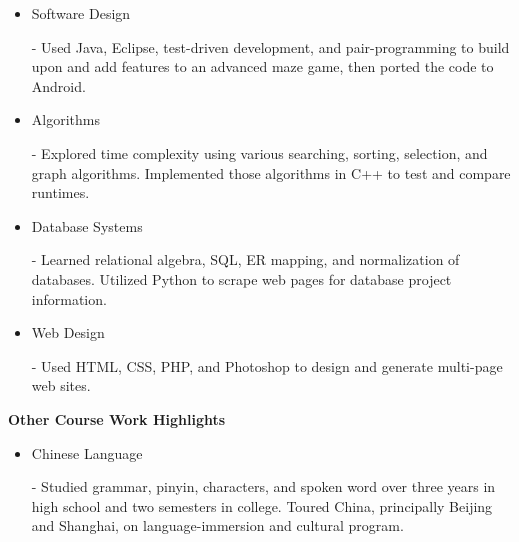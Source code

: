 \documentclass[11pt]{article}
\begin{document}
\begin{itemize}
	\item \begin{large}\begin{bf}Software Design\end{bf}\end{large} - Used Java, Eclipse, test-driven development, and pair-programming to build upon and add features to an advanced maze game, then ported the code to Android.
	\vspace{-0.5em}
	\item \begin{large}\begin{bf}Algorithms\end{bf}\end{large} - Explored time complexity using various searching, sorting, selection, and graph algorithms. Implemented those algorithms in C++ to test and compare runtimes.
	\vspace{-0.5em}
	\item \begin{large}\begin{bf}Database Systems\end{bf}\end{large} - Learned relational algebra, SQL, ER mapping, and normalization of databases. Utilized Python to scrape web pages for database project information.
	\vspace{-0.5em}
	\item \begin{large}\begin{bf}Web Design\end{bf}\end{large} - Used HTML, CSS, PHP, and Photoshop to design and generate multi-page web sites.
\end{itemize}

\vspace{-0.3em}

\begin{LARGE}
	\bf Other Course Work Highlights
\end{LARGE}

\vspace{-0.5em}

\begin{itemize}
	\item \begin{large}\begin{bf}Chinese Language\end{bf}\end{large} - Studied grammar, pinyin, characters, and spoken word over three years in high school and two semesters in college. Toured China, principally Beijing and Shanghai, on language-immersion and cultural program.
\end{itemize}
\end{document}
